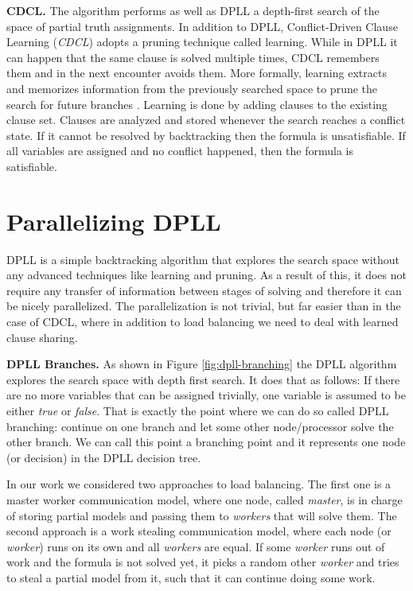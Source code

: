 \documentclass[letterpaper]{article}
\newcommand{\mypar}[1]{{\bf #1.}}
\begin{document}
\mypar{CDCL}
The algorithm performs as well as DPLL a depth-first search of the space of partial truth assignments.
In addition to DPLL, Conflict-Driven Clause Learning (\textit{CDCL}) adopts a pruning technique called learning.
While in DPLL it can happen that the same clause is solved multiple times, CDCL remembers them and in the next encounter avoids them.
More formally, learning extracts and memorizes information from the previously searched space to prune the search for future branches \cite{cdcl}.
Learning is done by adding clauses to the existing clause set.
Clauses are analyzed and stored whenever the search reaches a conflict state.
If it cannot be resolved by backtracking then the formula is unsatisfiable.
If all variables are assigned and no conflict happened, then the formula is satisfiable.

\section{Parallelizing DPLL}\label{sec:parallel_dpll}

DPLL is a simple backtracking algorithm that explores the search space without any advanced techniques like learning and pruning.
As a result of this, it does not require any transfer of information between stages of solving and therefore it can be nicely parallelized.
The parallelization is not trivial, but far easier than in the case of CDCL, where in addition to load balancing we need to deal with learned clause sharing.


\mypar{DPLL Branches}
As shown in Figure \ref{fig:dpll-branching} the DPLL algorithm explores the search space with depth first search.
It does that as follows: If there are no more variables that can be assigned trivially, one variable is assumed to be either \textit{true} or \textit{false}.
That is exactly the point where we can do so called DPLL branching: continue on one branch and let some other node/processor solve the other branch.
We can call this point a branching point and it represents one node (or decision) in the DPLL decision tree.

In our work we considered two approaches to load balancing.
The first one is a master worker communication model, where one node, called \textit{master}, is in charge of storing partial models and passing them to \textit{workers} that will solve them.
The second approach is a work stealing communication model, where each node (or \textit{worker}) runs on its own and all \textit{workers} are equal.
If some \textit{worker} runs out of work and the formula is not solved yet, it picks a random other \textit{worker} and tries to steal a partial model from it, such that it can continue doing some work.
\end{document}
